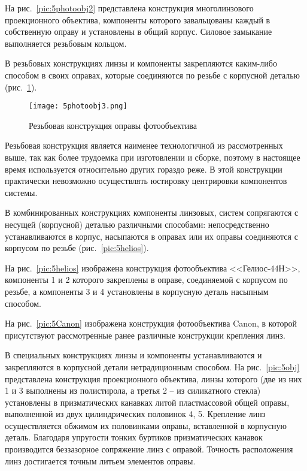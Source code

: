 На рис.~\ref{pic:5photoobj2} представлена конструкция многолинзового проекционного объектива, компоненты которого завальцованы каждый в собственную оправу и установлены в общий корпус. Силовое замыкание выполняется резьбовым кольцом.

В резьбовых конструкциях линзы и компоненты закрепляются каким-либо способом в своих оправах, которые соединяются по резьбе с корпусной деталью (рис.~\ref{pic:5photoobj3}).

\begin{figure}[h!]
	\begin{center}
		\texttt{[image: 5photoobj3.png]}
		\caption{ Резьбовая конструкция оправы фотообъектива }
		\label{pic:5photoobj3}
	\end{center}
\end{figure}

Резьбовая конструкция является наименее технологичной из рассмотренных выше, так как более трудоемка при изготовлении и сборке, поэтому в настоящее время используется относительно других гораздо реже. В этой конструкции практически невозможно осуществлять юстировку центрировки компонентов системы.

В комбинированных конструкциях компоненты линзовых, систем сопрягаются с несущей (корпусной) деталью различными способами: непосредственно устанавливаются в корпус, насыпаются в оправах или их оправы соединяются с корпусом по резьбе (рис.~\ref{pic:5helios}).

На рис.~\ref{pic:5helios} изображена конструкция фотообъектива <<Гелиос-44Н>>, компоненты 1 и 2 которого закреплены в оправе, соединяемой с корпусом по резьбе, а компоненты 3 и 4 установлены в корпусную деталь насыпным способом. 

На рис.~\ref{pic:5Canon} изображена конструкция фотообъектива Canon, в которой присутствуют рассмотренные ранее различные конструкции крепления линз.

В специальных конструкциях линзы и компоненты устанавливаются и закрепляются в корпусной детали нетрадиционным способом. На рис.~\ref{pic:5obj} представлена конструкция проекционного объектива, линзы которого (две из них 1 и 3 выполнены из полистирола, а третья 2 -- из силикатного стекла) установлены в призматических канавках литой пластмассовой общей оправы, выполненной из двух цилиндрических половинок 4, 5. Крепление линз осуществляется обжимом их половинками оправы, вставленной в корпусную деталь. Благодаря упругости тонких буртиков призматических канавок производится беззазорное сопряжение линз с оправой. Точность расположения линз достигается точным литьем элементов оправы.

